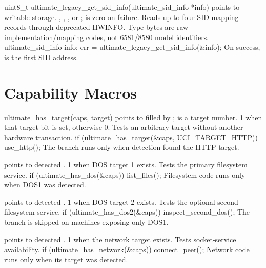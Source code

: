 \begin{referencechapter}
{uint8\_t ultimate\_legacy\_get\_sid\_info(ultimate\_sid\_info *info)}
{ points to writable
\hyperref[struct:ultimate-sid-info]{} storage.}
{, ,
, or ;
 is zero on failure.}
{Reads up to four SID mapping records through deprecated HWINFO. Type bytes are
raw implementation/mapping codes, not 6581/8580 model identifiers.}
{ultimate\_sid\_info info; err = ultimate\_legacy\_get\_sid\_info(\&info);}
{On success,  is the first SID address.}

\section{Capability Macros}

{ultimate\_has\_target(caps, target)}
{ points to
\hyperref[struct:ultimate-capabilities]{} filled by
;  is a target number.}
{1 when that target bit is set, otherwise 0.}
{Tests an arbitrary target without another hardware transaction.}
{if (ultimate\_has\_target(\&caps, UCI\_TARGET\_HTTP)) use\_http();}
{The branch runs only when detection found the HTTP target.}

{ points to detected
\hyperref[struct:ultimate-capabilities]{}.}
{1 when DOS target 1 exists.}
{Tests the primary filesystem service.}
{if (ultimate\_has\_dos(\&caps)) list\_files();}
{Filesystem code runs only when DOS1 was detected.}

{ points to detected
\hyperref[struct:ultimate-capabilities]{}.}
{1 when DOS target 2 exists.}
{Tests the optional second filesystem service.}
{if (ultimate\_has\_dos2(\&caps)) inspect\_second\_dos();}
{The branch is skipped on machines exposing only DOS1.}

{ points to detected
\hyperref[struct:ultimate-capabilities]{}.}
{1 when the network target exists.}
{Tests socket-service availability.}
{if (ultimate\_has\_network(\&caps)) connect\_peer();}
{Network code runs only when its target was detected.}


\end{referencechapter}

